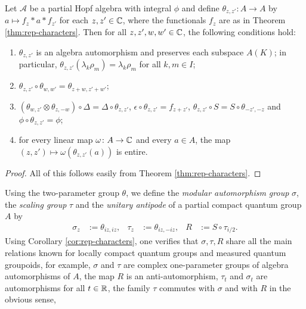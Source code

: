 \begin{Cor} \label{cor:rep-characters} Let $\mathscr{A}$ be a partial
  Hopf algebra with integral $\phi$ and define $\theta_{z,z'} \colon A
  \to A$ by $a \mapsto f_{z} \ast a \ast f_{z'}$ for each $z,z' \in
  \mathbb{C}$, where the functionals $f_{z}$ are as in Theorem
  \ref{thm:rep-characters}. Then for all $z,z',w,w'\in \mathbb{C}$, the
  following conditions hold:
  \begin{enumerate}
  \item $\theta_{z,z'}$ is an algebra automorphism and preserves
    each subspace $A(K)$; in particular,
    $\theta_{z,z'}(\lambda_{k}\rho_{m}) = \lambda_{k}\rho_{m}$ for all
    $k,m\in I$;
  \item $\theta_{z,z'}\circ \theta_{w,w'} = \theta_{z+w,z'+w'}$;
  \item $ (\theta_{w,z'} \otimes \theta_{z,-w}) \circ \Delta = \Delta
    \circ \theta_{z,z'}$, $\epsilon \circ \theta_{z,z'} = f_{z+z'}$,
    $\theta_{z,z'} \circ S = S \circ \theta_{-z',-z}$ and
    $\phi \circ \theta_{z,z'} = \phi$;
  \item for every linear map $\omega \colon A \to \mathbb{C}$ and every $a\in
    A$, the map $(z,z') \mapsto \omega(\theta_{z,z'}(a))$ is entire.
  \end{enumerate}
\end{Cor}
\begin{proof}
  All of this follows easily from Theorem \ref{thm:rep-characters}.
\end{proof}
Using the two-parameter group $\theta$, we define the \emph{modular
  automorphism group} $\sigma$, the \emph{scaling group} $\tau$   and
the \emph{unitary antipode} of a partial compact quantum group $A$ by
\begin{align*}
  \sigma_{z} &:=\theta_{iz,iz}, & \tau_{z} &:=\theta_{iz,-iz}, & R&:=S
  \circ \tau_{i/2}.
\end{align*}
Using Corollary \ref{cor:rep-characters}, one verifies that
$\sigma,\tau,R$ share all the main relations known for locally compact
quantum groups and measured quantum groupoids, for example, $\sigma$
and $\tau$ are complex one-parameter groups of algebra automorphisms
of $A$, the map $R$ is an anti-automorphism,  $\tau_{t}$ and
$\sigma_{t}$ are automorphisms for all $t\in \mathbb{R}$, the family  $\tau$ commutes with
$\sigma$ and with $R$ in the obvious sense, 
